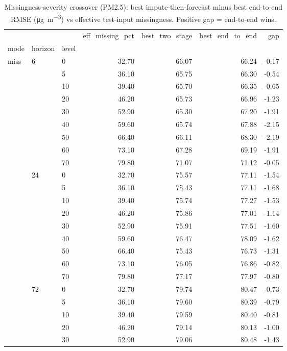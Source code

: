 \begin{table}
\caption{Missingness-severity crossover (PM2.5): best impute-then-forecast minus best end-to-end RMSE (\si{\micro\gram\per\cubic\metre}) vs effective test-input missingness. Positive gap = end-to-end wins.}
\label{tab:crossover}
\begin{tabular}{lllrrrr}
\toprule
 &  &  & eff\_missing\_pct & best\_two\_stage & best\_end\_to\_end & gap \\
mode & horizon & level &  &  &  &  \\
\midrule
\multirow[t]{27}{*}{miss} & \multirow[t]{9}{*}{6} & 0 & 32.70 & 66.07 & 66.24 & -0.17 \\
 &  & 5 & 36.10 & 65.75 & 66.30 & -0.54 \\
 &  & 10 & 39.40 & 65.70 & 66.35 & -0.65 \\
 &  & 20 & 46.20 & 65.73 & 66.96 & -1.23 \\
 &  & 30 & 52.90 & 65.30 & 67.20 & -1.91 \\
 &  & 40 & 59.60 & 65.74 & 67.88 & -2.15 \\
 &  & 50 & 66.40 & 66.11 & 68.30 & -2.19 \\
 &  & 60 & 73.10 & 67.28 & 69.19 & -1.91 \\
 &  & 70 & 79.80 & 71.07 & 71.12 & -0.05 \\
\cline{2-7}
 & \multirow[t]{9}{*}{24} & 0 & 32.70 & 75.57 & 77.11 & -1.54 \\
 &  & 5 & 36.10 & 75.43 & 77.11 & -1.68 \\
 &  & 10 & 39.40 & 75.74 & 77.27 & -1.53 \\
 &  & 20 & 46.20 & 75.86 & 77.01 & -1.14 \\
 &  & 30 & 52.90 & 75.91 & 77.51 & -1.60 \\
 &  & 40 & 59.60 & 76.47 & 78.09 & -1.62 \\
 &  & 50 & 66.40 & 75.43 & 76.73 & -1.31 \\
 &  & 60 & 73.10 & 76.05 & 76.86 & -0.82 \\
 &  & 70 & 79.80 & 77.17 & 77.97 & -0.80 \\
\cline{2-7}
 & \multirow[t]{9}{*}{72} & 0 & 32.70 & 79.74 & 80.47 & -0.73 \\
 &  & 5 & 36.10 & 79.60 & 80.39 & -0.79 \\
 &  & 10 & 39.40 & 79.59 & 80.40 & -0.81 \\
 &  & 20 & 46.20 & 79.14 & 80.13 & -1.00 \\
 &  & 30 & 52.90 & 79.06 & 80.48 & -1.43 \\

\end{tabular}
\end{table}
